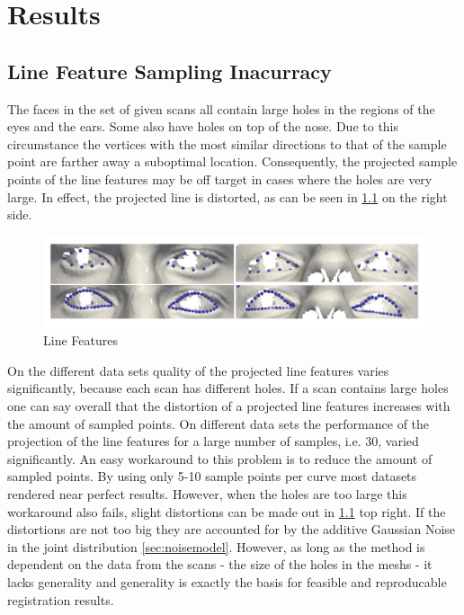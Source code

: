 \chapter{Results}
\label{chap:results}
\section{Line Feature Sampling Inacurracy}
\label{sec:linefeature_inaccuracy}
The faces in the set of given scans all contain large holes in the regions of the eyes and the ears. Some also have holes on top of the nose.
Due to this circumstance the vertices with the most similar directions to that of the sample point are farther away a suboptimal location. 
Consequently, the projected sample points of the line features may be off target in cases where the holes are very large. In effect, the projected line is distorted, as can be seen in \ref{fig:linefeature_comparison} on the right side. 
\begin{figure}[h!]
    \centering
    \includegraphics[width=\textwidth]{./resources/img/linefeatures_eyes.pdf}
    \caption{Line Features}
    \label{fig:linefeature_comparison}
\end{figure}
On the different data sets quality of the projected line features varies significantly, because each scan has different holes. If a scan contains large holes one can say overall that the distortion of a projected line features increases with the amount of sampled points. 
On different data sets the performance of the projection of the line features for a large number of
samples, i.e. 30, varied significantly. 
An easy workaround to this problem is to reduce the amount of sampled points. By using only 5-10 sample points per curve most datasets rendered near perfect results. 
However, when the holes are too large this workaround also fails, slight distortions can be made out in \ref{fig:linefeature_comparison} top right.
If the distortions are not too big they are accounted for by the additive Gaussian Noise in the joint distribution \ref{sec:noisemodel}.
However, as long as the method is dependent on the data from the scans - the size of the holes in the meshs - it lacks generality and generality is exactly the basis for feasible and reproducable registration results.\\

